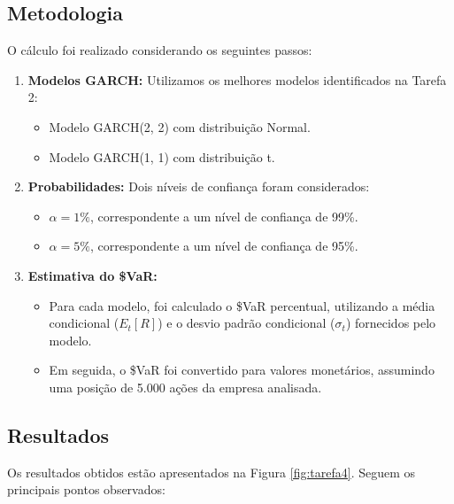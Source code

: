 \documentclass[a4paper, 12pt]{article}
\begin{document}
\subsection{Metodologia}
O cálculo foi realizado considerando os seguintes passos:
\begin{enumerate}
    \item \textbf{Modelos GARCH:} Utilizamos os melhores modelos identificados na Tarefa 2:
    \begin{itemize}
        \item Modelo GARCH(2, 2) com distribuição Normal.
        \item Modelo GARCH(1, 1) com distribuição t.
    \end{itemize}
    \item \textbf{Probabilidades:} Dois níveis de confiança foram considerados:
    \begin{itemize}
        \item \(\alpha = 1\%\), correspondente a um nível de confiança de 99\%.
        \item \(\alpha = 5\%\), correspondente a um nível de confiança de 95\%.
    \end{itemize}
    \item \textbf{Estimativa do \$VaR:}
    \begin{itemize}
        \item Para cada modelo, foi calculado o \$VaR percentual, utilizando a média condicional (\(E_t[R]\)) e o desvio padrão condicional (\(\sigma_t\)) fornecidos pelo modelo.
        \item Em seguida, o \$VaR foi convertido para valores monetários, assumindo uma posição de 5.000 ações da empresa analisada.
    \end{itemize}
\end{enumerate}

\subsection{Resultados}
Os resultados obtidos estão apresentados na Figura \ref{fig:tarefa4}. Seguem os principais pontos observados:
\end{document}
